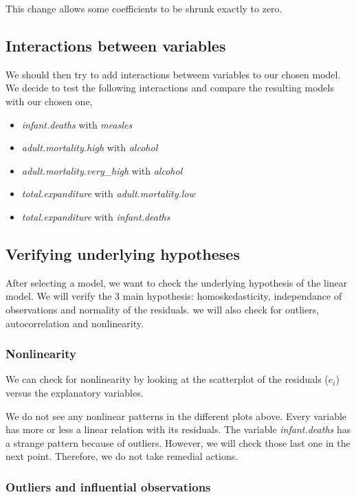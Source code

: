 This change allows some coefficients to be shrunk exactly to zero.

\subsection{Interactions between variables}

We should then try to add interactions betweem variables to our chosen model. We decide to test the following interactions and compare the resulting models with our chosen one,

\begin{itemize}
	\item \textit{infant.deaths} with \textit{measles}
	\item \textit{adult.mortality.high} with \textit{alcohol}
	\item \textit{adult.mortality.very\_high} with \textit{alcohol}
	\item \textit{total.expanditure} with \textit{adult.mortality.low}
	\item \textit{total.expanditure} with \textit{infant.deaths}
\end{itemize}

\subsection{Verifying underlying hypotheses}

After selecting a model, we want to check the underlying hypothesis of the linear model. We will verify the 3 main hypothesis: homoskedasticity, independance of observations and normality of the residuals. we will also check for outliers, autocorrelation and nonlinearity.

\subsubsection{Nonlinearity}

We can check for nonlinearity by looking at the scatterplot of the residuals ($e_i$) versus the explanatory variables.


We do not see any nonlinear patterns in the different plots above. Every variable has more or less a linear relation with its residuals. The variable \textit{infant.deaths} has a strange pattern because of outliers. However, we will check those last one in the next point. Therefore, we do not take remedial actions.

\subsubsection{Outliers and influential observations}


